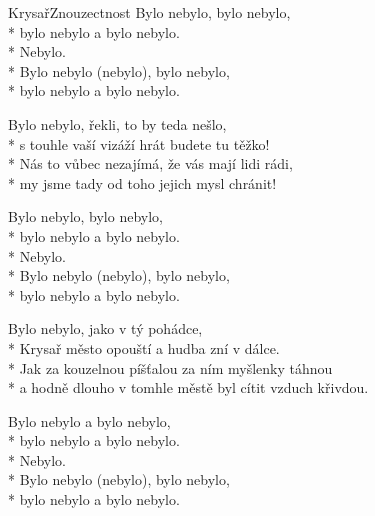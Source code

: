 \documentclass[10.5pt]{book}
\begin{document}
\begin{poem}{Krysař}{Znouzectnost}
Bylo nebylo, bylo nebylo,\\*
bylo nebylo a bylo nebylo.\\*
Nebylo. \\*
Bylo nebylo (nebylo), bylo nebylo,\\*
bylo nebylo a bylo nebylo.

Bylo nebylo, řekli, to by teda nešlo,\\*
s touhle vaší vizáží hrát budete tu těžko!\\*
Nás to vůbec nezajímá, že vás mají lidi rádi,\\*
my jsme tady od toho jejich mysl chránit!

Bylo nebylo, bylo nebylo,\\*
bylo nebylo a bylo nebylo.\\*
Nebylo. \\*
Bylo nebylo (nebylo), bylo nebylo,\\*
bylo nebylo a bylo nebylo.

Bylo nebylo, jako v tý pohádce,\\*
Krysař město opouští a hudba zní v dálce.\\*
Jak za kouzelnou píšťalou za ním myšlenky táhnou\\*
a hodně dlouho v tomhle městě byl cítit vzduch křivdou.

Bylo nebylo a bylo nebylo,\\*
bylo nebylo a bylo nebylo.\\*
Nebylo. \\*
Bylo nebylo (nebylo), bylo nebylo,\\*
bylo nebylo a bylo nebylo.
\end{poem}
\end{document}
